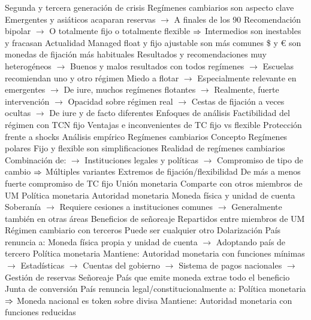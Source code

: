 \documentclass{nuevotema}
\begin{document}
\begin{esquemal}
				\4[] Segunda y tercera generación de crisis
				\4[] Regímenes cambiarios son aspecto clave
				\4[] Emergentes y asiáticos acaparan reservas
				\4[] $\to$ A finales de los 90
				\4[] Recomendación bipolar
				\4[] $\to$ O totalmente fijo o totalmente flexible
				\4[] $\Rightarrow$ Intermedios son inestables y fracasan
				\4 Actualidad
				\4[] Managed float y fijo ajustable son más comunes
				\4[] \$ y € son monedas de fijación más habituales
				\4[] Resultados y recomendaciones muy heterogéneos
				\4[] $\to$ Buenos y malos resultados con todos regímenes
				\4[] $\to$ Escuelas recomiendan uno y otro régimen
				\4[] Miedo a flotar
				\4[] $\to$ Especialmente relevante en emergentes
				\4[] $\to$ De iure, muchos regímenes flotantes
				\4[] $\to$ Realmente, fuerte intervención
				\4[] $\to$ Opacidad sobre régimen real
				\4[] $\to$ Cestas de fijación a veces ocultas
				\4[] $\to$ De iure y de facto diferentes
			\3 Enfoques de análisis
				\4 Factibilidad del régimen con TCN fijo
				\4 Ventajas e inconvenientes de TC fijo vs flexible
				\4 Protección frente a shocks
				\4 Análisis empírico
		\2 Regímenes cambiarios
			\3 Concepto
				\4 Regímenes polares
				\4[] Fijo y flexible son simplificaciones
				\4 Realidad de regímenes cambiarios
				\4[] Combinación de:
				\4[] $\to$ Instituciones legales y políticas
				\4[] $\to$ Compromiso de tipo de cambio
				\4[] $\Rightarrow$ Múltiples variantes
				\4 Extremos de fijación/flexibilidad
				\4[] De más a menos fuerte compromiso de TC fijo
			\3 Unión monetaria
				\4 Comparte con otros miembros de UM
				\4[] Política monetaria 
				\4[] Autoridad monetaria
				\4[] Moneda física y unidad de cuenta
				\4[] Soberanía
				\4[] $\to$ Requiere cesiones a instituciones comunes
				\4[] $\to$ Generalmente también en otras áreas
				\4 Beneficios de señoreaje
				\4[] Repartidos entre miembros de UM 
				\4 Régimen cambiario con terceros
				\4[] Puede ser cualquier otro
			\3 Dolarización
				\4 País renuncia a:
				\4[] Moneda física propia y unidad de cuenta
				\4[] $\to$ Adoptando país de tercero
				\4[] Política monetaria
				\4 Mantiene:
				\4[] Autoridad monetaria con funciones mínimas
				\4[] $\to$ Estadísticas
				\4[] $\to$ Cuentas del gobierno 
				\4[] $\to$ Sistema de pagos nacionales
				\4[] $\to$ Gestión de reservas
				\4 Señoreaje
				\4[] País que emite moneda extrae todo el beneficio
			\3 Junta de conversión
				\4 País renuncia legal/constitucionalmente a:
				\4[] Política monetaria
				\4[] $\Rightarrow$ Moneda nacional es token sobre divisa
				\4 Mantiene:
				\4[] Autoridad monetaria con funciones reducidas

\end{esquemal}
\end{document}
